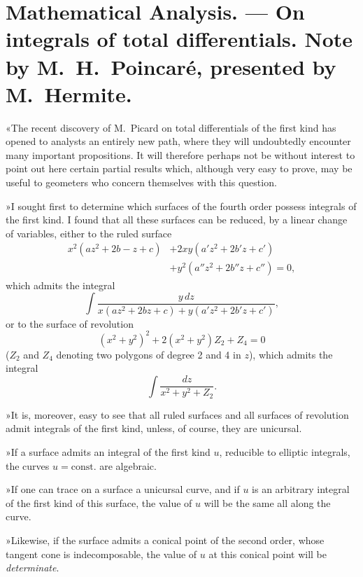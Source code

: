 \documentclass{article}
\begin{document}
\section*{Mathematical Analysis. --- On integrals of total differentials. Note by M.~H.~Poincaré, presented by M.~Hermite.}

«The recent discovery of M.~Picard on total differentials of the first kind has opened to analysts an entirely new path, where they will undoubtedly encounter many important propositions. It will therefore perhaps not be without interest to point out here certain partial results which, although very easy to prove, may be useful to geometers who concern themselves with this question.

»I sought first to determine which surfaces of the fourth order possess integrals of the first kind. I found that all these surfaces can be reduced, by a linear change of variables, either to the ruled surface
\[
\begin{aligned}
x^{2}(az^{2} + 2b - z + c) &+ 2xy(a'z^{2} + 2b'z + c') \\
&+ y^{2}(a''z^{2} + 2b''z + c'') = 0,
\end{aligned}
\]
which admits the integral
\[
\int \frac{y\,dz}{x(az^{2} + 2bz + c) + y(a'z^{2} + 2b'z + c')},
\]
or to the surface of revolution
\[
(x^{2} + y^{2})^{2} + 2(x^{2} + y^{2})Z_{2} + Z_{4} = 0
\]
($Z_{2}$ and $Z_{4}$ denoting two polygons of degree 2 and 4 in $z$), which admits the integral
\[
\int \frac{dz}{x^{2} + y^{2} + Z_{2}}.
\]

»It is, moreover, easy to see that all ruled surfaces and all surfaces of revolution admit integrals of the first kind, unless, of course, they are unicursal.

»If a surface admits an integral of the first kind $u$, reducible to elliptic integrals, the curves $u = \text{const.}$ are algebraic.

»If one can trace on a surface a unicursal curve, and if $u$ is an arbitrary integral of the first kind of this surface, the value of $u$ will be the same all along the curve.

»Likewise, if the surface admits a conical point of the second order, whose tangent cone is indecomposable, the value of $u$ at this conical point will be \emph{determinate}.
\end{document}
